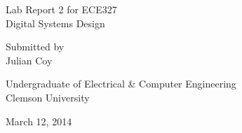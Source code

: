\documentclass[11pt]{report}
\begin{document}
\begin{spacing}{1.5}

\thispagestyle{empty}

\begin{scshape}

\vspace*{30pt}
{
\Huge
\begin{center}
    \reporttitle
\end{center}
}
\vspace{30pt}

{
\Large
\begin{center}
  Lab Report 2 for ECE327 \\
  Digital Systems Design
\end{center}
}
\vspace{30pt}
{
\Large 
\begin{center}
  Submitted by \\
  Julian Coy
\end{center}
}
\vspace{120pt}

{
\Large
\begin{center}
  Undergraduate of Electrical \& Computer Engineering \\
  Clemson University
\end{center}
}
\vspace{30pt}

{
\Large
\begin{center}
  March 12, 2014
\end{center}
}

\end{scshape}

\clearpage
\setcounter{page}{1}


\vspace{15pt}
  \setcounter{chapter}{1}

\end{spacing}
\end{document}
